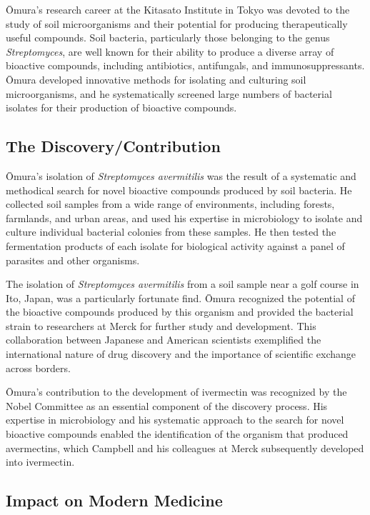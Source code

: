 \=Omura's research career at the Kitasato Institute in Tokyo was devoted to the study of soil microorganisms and their potential for producing therapeutically useful compounds. Soil bacteria, particularly those belonging to the genus \textit{Streptomyces}, are well known for their ability to produce a diverse array of bioactive compounds, including antibiotics, antifungals, and immunosuppressants. \=Omura developed innovative methods for isolating and culturing soil microorganisms, and he systematically screened large numbers of bacterial isolates for their production of bioactive compounds.

\subsection{The Discovery/Contribution}

\=Omura's isolation of \textit{Streptomyces avermitilis} was the result of a systematic and methodical search for novel bioactive compounds produced by soil bacteria. He collected soil samples from a wide range of environments, including forests, farmlands, and urban areas, and used his expertise in microbiology to isolate and culture individual bacterial colonies from these samples. He then tested the fermentation products of each isolate for biological activity against a panel of parasites and other organisms.

The isolation of \textit{Streptomyces avermitilis} from a soil sample near a golf course in Ito, Japan, was a particularly fortunate find. \=Omura recognized the potential of the bioactive compounds produced by this organism and provided the bacterial strain to researchers at Merck for further study and development. This collaboration between Japanese and American scientists exemplified the international nature of drug discovery and the importance of scientific exchange across borders.

\=Omura's contribution to the development of ivermectin was recognized by the Nobel Committee as an essential component of the discovery process. His expertise in microbiology and his systematic approach to the search for novel bioactive compounds enabled the identification of the organism that produced avermectins, which Campbell and his colleagues at Merck subsequently developed into ivermectin.

\subsection{Impact on Modern Medicine}

